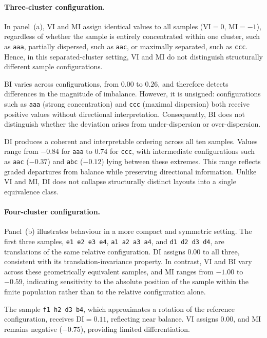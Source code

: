\documentclass[12pt]{imsart}
\theoremstyle{plain}
\theoremstyle{remark}
\begin{document}
\paragraph{Three-cluster configuration.}

In panel~(a), VI and MI assign identical values to all samples
(\(\mathrm{VI}=0\), \(\mathrm{MI}=-1\)), regardless of whether the sample is
entirely concentrated within one cluster, such as \texttt{aaa}, partially
dispersed, such as \texttt{aac}, or maximally separated, such as
\texttt{ccc}. Hence, in this separated-cluster setting, VI and MI do not
distinguish structurally different sample configurations.

BI varies across configurations, from \(0.00\) to \(0.26\), and therefore
detects differences in the magnitude of imbalance. However, it is unsigned:
configurations such as \texttt{aaa} (strong concentration) and \texttt{ccc}
(maximal dispersion) both receive positive values without directional
interpretation. Consequently, BI does not distinguish whether the deviation
arises from under-dispersion or over-dispersion.

DI produces a coherent and interpretable ordering across all ten samples.
Values range from \(-0.84\) for \texttt{aaa} to \(0.74\) for \texttt{ccc},
with intermediate configurations such as \texttt{aac} (\(-0.37\)) and
\texttt{abc} (\(-0.12\)) lying between these extremes. This range reflects
graded departures from balance while preserving directional information.
Unlike VI and MI, DI does not collapse structurally distinct layouts into a
single equivalence class.

\paragraph{Four-cluster configuration.}

Panel~(b) illustrates behaviour in a more compact and symmetric setting. The
first three samples,
\texttt{e1 e2 e3 e4}, \texttt{a1 a2 a3 a4}, and \texttt{d1 d2 d3 d4},
are translations of the same relative configuration. DI assigns \(0.00\) to
all three, consistent with its translation-invariance property. In contrast,
VI and BI vary across these geometrically equivalent samples, and MI ranges
from \(-1.00\) to \(-0.59\), indicating sensitivity to the absolute position
of the sample within the finite population rather than to the relative
configuration alone.

The sample \texttt{f1 h2 d3 b4}, which approximates a rotation of the
reference configuration, receives \(\mathrm{DI}=0.11\), reflecting near
balance. VI assigns \(0.00\), and MI remains negative (\(-0.75\)), providing
limited differentiation.
\end{document}
